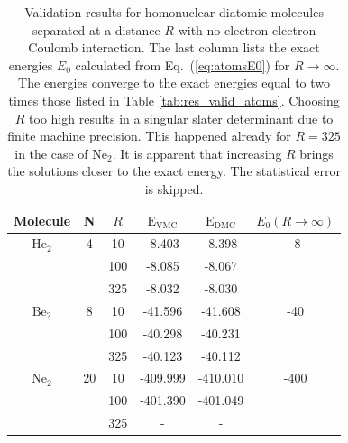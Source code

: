 \setlength{\tabcolsep}{0.6cm}
\begin{table}
\begin{center}
\begin{tabular}{cc|cccc}
 Molecule &   N     & $R$ & $\mathrm{E_{VMC}}$ & $\mathrm{E_{DMC}}$ & $E_0(R\to\infty)$\\
\hline
 $\mathrm{He}_2$  & 4     & 10  &   -8.403     &  -8.398    & -8  \\
   &       & 100 &   -8.085     &  -8.067    &     \\
   &       & 325 &   -8.032     &  -8.030    &     \\
 $\mathrm{Be}_2$  & 8     & 10  &  -41.596     &  -41.608   & -40 \\
  &        & 100 &  -40.298     &  -40.231   &     \\
   &       & 325 &  -40.123     &  -40.112   &     \\
 $\mathrm{Ne}_2$ &  20    & 10  &  -409.999    &  -410.010  & -400\\
  &        & 100 &  -401.390    &  -401.049  &     \\
  &        & 325 &  -           &  -         &     \\
\end{tabular}
\caption{Validation results for homonuclear diatomic molecules separated at a distance $R$ with no electron-electron Coulomb interaction. The last column lists the exact energies $E_0$ calculated from Eq.~(\ref{eq:atomsE0}) for $R\to\infty$. The energies converge to the exact energies equal to two times those listed in Table \ref{tab:res_valid_atoms}. Choosing $R$ too high results in a singular slater determinant due to finite machine precision. This happened already for $R=325$ in the case of  $\mathrm{Ne}_2$. It is apparent that increasing $R$ brings the solutions closer to the exact energy. The statistical error is skipped.}
\label{tab:res_valid_molecules}
\end{center}
\end{table}
\setlength{\tabcolsep}{6pt}


